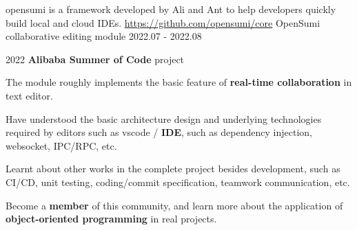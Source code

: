 

\begin{cventries}


\cventry
     {opensumi is a framework developed by Ali and Ant to help developers quickly build local and cloud IDEs. \href{https://github.com/opensumi/core}{https://github.com/opensumi/core}} %
     {OpenSumi collaborative editing module} %
     {} %
     {2022.07 - 2022.08} %
     {
       \begin{cvitems} %
         \item {2022 \textbf{Alibaba Summer of Code} project}
         \item {The module roughly implements the basic feature of \textbf{real-time collaboration} in text editor. }
         \item {Have understood the basic architecture design and underlying technologies required by editors such as vscode / \textbf{IDE}, such as dependency injection, websocket, IPC/RPC, etc. }
         \item {Learnt about other works in the complete project besides development, such as CI/CD, unit testing, coding/commit specification, teamwork communication, etc. }
         \item {Become a \textbf{member} of this community, and learn more about the application of \textbf{object-oriented programming} in real projects. }
       \end{cvitems}
     }



\end{cventries}

